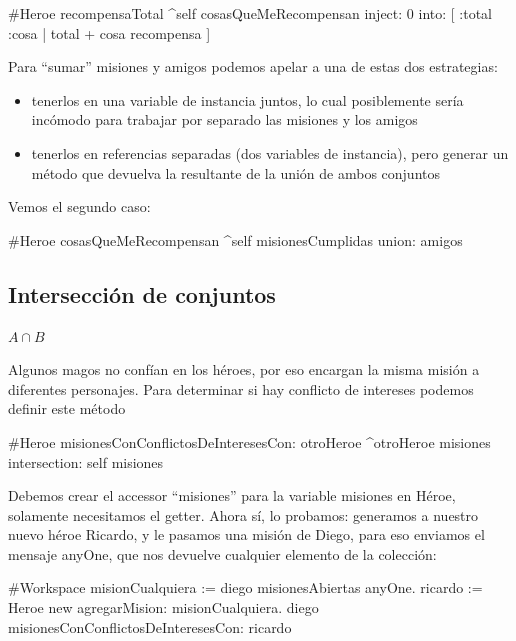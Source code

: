 \documentclass[a4paper,12pt]{book}
\begin{document}
\begin{code}
#Heroe
recompensaTotal
   ^self cosasQueMeRecompensan 
            inject: 0
            into: [ :total :cosa | total + cosa recompensa ]
\end{code}

Para ``sumar'' misiones y amigos podemos apelar a una de estas dos estrategias:

\begin{itemize}
 \item tenerlos en una variable de instancia juntos, lo cual posiblemente sería incómodo para trabajar
 por separado las misiones y los amigos
 \item tenerlos en referencias separadas (dos variables de instancia), pero generar un método que devuelva
 la resultante de la unión de ambos conjuntos
\end{itemize}

Vemos el segundo caso:

\begin{code}
#Heroe
cosasQueMeRecompensan
    ^self misionesCumplidas union: amigos
\end{code}

\subsection{Intersección de conjuntos}

\begin{mdframed}[style=BoxFrame]
\( A \cap B \)
\end{mdframed}

Algunos magos no confían en los héroes, por eso encargan la misma misión a diferentes personajes. Para determinar
si hay conflicto de intereses podemos definir este método

\begin{code}
#Heroe
misionesConConflictosDeInteresesCon: otroHeroe
     ^otroHeroe misiones intersection: self misiones
\end{code}

Debemos crear el accessor ``misiones'' para la variable misiones en Héroe, solamente necesitamos el getter. 
Ahora sí, lo probamos: generamos a nuestro nuevo héroe Ricardo, y le pasamos una misión de Diego, 
para eso enviamos el mensaje anyOne, que nos devuelve cualquier elemento de la colección:

\begin{code}
#Workspace
 misionCualquiera := diego misionesAbiertas anyOne.
 ricardo := Heroe new agregarMision: misionCualquiera.
 diego misionesConConflictosDeInteresesCon: ricardo
\end{code}
\end{document}
